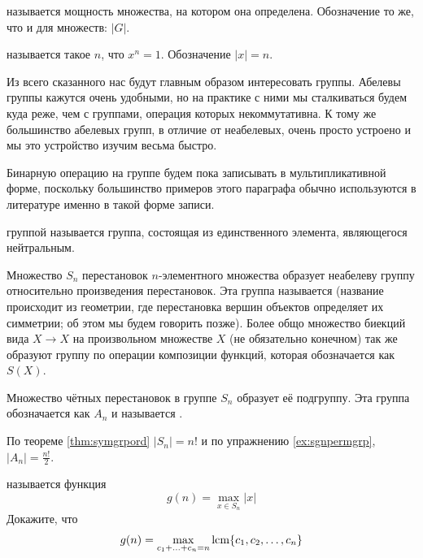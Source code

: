 \begin{definition}
	 называется мощность множества, на котором она определена. Обозначение то же, что и для множеств: $|G|$.
\end{definition}

\begin{definition}
	 называется такое $n$, что $x^n = 1$. Обозначение $|x| = n$.
\end{definition}

Из всего сказанного нас будут главным образом интересовать группы. Абелевы группы кажутся очень удобными, но на практике с ними мы сталкиваться будем куда реже, чем с группами, операция которых некоммутативна. К тому же большинство абелевых групп, в отличие от неабелевых, очень просто устроено и мы это устройство изучим весьма быстро.

Бинарную операцию на группе будем пока записывать в мультипликативной форме, поскольку большинство примеров этого параграфа обычно используются в литературе именно в такой форме записи.

\begin{example}
	 группой называется группа, состоящая из единственного элемента, являющегося нейтральным.
\end{example}

\begin{example}
	Множество $S_n$ перестановок $n$-элементного множества образует неабелеву группу относительно произведения перестановок. Эта группа называется  (название происходит из геометрии, где перестановка вершин объектов определяет их симметрии; об этом мы будем говорить позже). Более общо множество биекций вида $X\to X$ на произвольном множестве $X$ (не обязательно конечном) так же образуют группу по операции композиции функций, которая обозначается как $S(X)$.
\end{example}

\begin{example}
	Множество чётных перестановок в группе $S_n$ образует её подгруппу. Эта группа обозначается как $A_n$ и называется .
\end{example}

\begin{example}
	По теореме \ref{thm:symgrpord} $|S_n| = n!$ и по упражнению \ref{ex:sgnpermgrp}, $|A_n| = \frac{n!}{2}$.
\end{example}

\begin{exercise}
	 называется функция
	\[
	g(n) = \max_{x\in S_n} |x|
	\]
	Докажите, что
	\[
	g(n) = \max_{c_1+\ldots+c_n = n} \operatorname{lcm}\{c_1, c_2, \ldots, c_n\}
	\]
\end{exercise}

